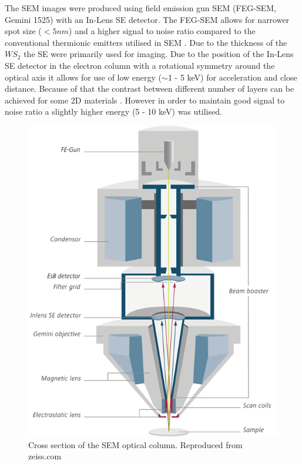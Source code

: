 The SEM images were produced using field emission gun SEM (FEG-SEM, Gemini 1525) with an In-Lens SE detector. The FEG-SEM allows for narrower spot size ($<5 nm$) and a higher signal to noise ratio compared to the conventional thermionic emitters utilised in SEM \cite{Ogura2009}. Due to the thickness of the $WS_2$ the SE were primarily used for imaging. Due to the position of the In-Lens SE detector in the electron column with a rotational symmetry around the optical axis it allows for use of low energy ($\sim$1 - 5 keV) for acceleration and close distance. Because of that the contrast between different number of layers can be achieved for some 2D materials \cite{Kochat2011}. However in order to maintain good signal to noise ratio a slightly higher energy (5 - 10 keV) was utilised.

\begin{figure}[!ht]
	\begin{center}
		\includegraphics[scale=0.3]{Methodology/SEMSetup.png}
		\caption{Cross section of the SEM optical column. Reproduced from zeiss.com}
		\label{fig:MethodologySEMSetup}
	\end{center}
\end{figure}

